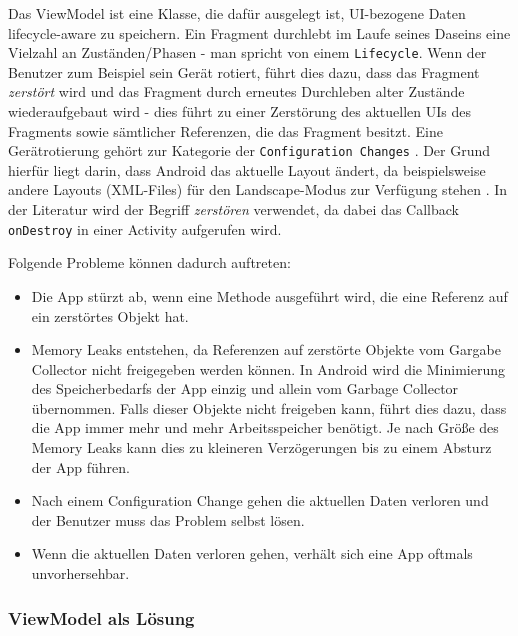 Das ViewModel ist eine Klasse, die dafür ausgelegt ist, UI-bezogene
Daten lifecycle-aware zu speichern. Ein Fragment durchlebt im Laufe
seines Daseins eine Vielzahl an Zuständen/Phasen - man spricht von einem
\texttt{Lifecycle}. Wenn der Benutzer zum Beispiel sein Gerät rotiert,
führt dies dazu, dass das Fragment \emph{zerstört} wird und das Fragment
durch erneutes Durchleben alter Zustände wiederaufgebaut wird - dies
führt zu einer Zerstörung des aktuellen UIs des Fragments sowie
sämtlicher Referenzen, die das Fragment besitzt. Eine Gerätrotierung
gehört zur Kategorie der \texttt{Configuration\ Changes}
\cite{viewmodel}. Der Grund hierfür liegt darin, dass Android das
aktuelle Layout ändert, da beispielsweise andere Layouts (XML-Files) für
den Landscape-Modus zur Verfügung stehen \cite{configuration-changes}.
In der Literatur wird der Begriff \emph{zerstören} verwendet, da dabei
das Callback \texttt{onDestroy} in einer Activity aufgerufen wird.

Folgende Probleme können dadurch auftreten:

\begin{itemize}
\tightlist
\item
  Die App stürzt ab, wenn eine Methode ausgeführt wird, die eine
  Referenz auf ein zerstörtes Objekt hat.
\item
  Memory Leaks entstehen, da Referenzen auf zerstörte Objekte vom
  Gargabe Collector nicht freigegeben werden können. In Android wird die
  Minimierung des Speicherbedarfs der App einzig und allein vom Garbage
  Collector übernommen. Falls dieser Objekte nicht freigeben kann, führt
  dies dazu, dass die App immer mehr und mehr Arbeitsspeicher benötigt.
  Je nach Größe des Memory Leaks kann dies zu kleineren Verzögerungen
  bis zu einem Absturz der App führen.
\item
  Nach einem Configuration Change gehen die aktuellen Daten verloren und
  der Benutzer muss das Problem selbst lösen.
\item
  Wenn die aktuellen Daten verloren gehen, verhält sich eine App oftmals
  unvorhersehbar.
\end{itemize}

\hypertarget{viewmodel-als-luxf6sung}{%
\subsubsection{ViewModel als Lösung}\label{viewmodel-als-luxf6sung}}

